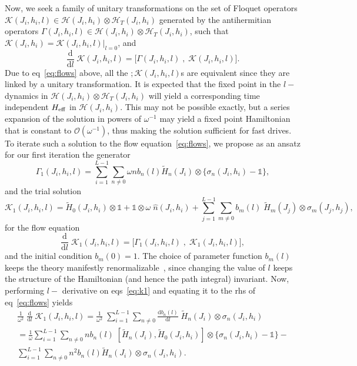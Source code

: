 \documentclass[a4paper,10pt]{article}
\begin{document}
Now, we seek a family of unitary transformations on the set of Floquet operators $\mathcal{K}(J_i,h_i,l)\in\mathcal{H}(J_i,h_i)\otimes\mathcal{H}_T(J_i,h_i) $ generated by the antihermitian operators $\Gamma(J_i,h_i,l)\in\mathcal{H}(J_i,h_i)\otimes\mathcal{H}_T(J_i,h_i)$, such that $\mathcal{K}(J_i,h_i) = \mathcal{K}(J_i,h_i,l)|_{l=0}$, and 
\begin{equation}
\label{eq:flows}
\frac{\mathrm{d}}{\mathrm{d}l}\;\mathcal{K}(J_i,h_i,l) = \bigg[\Gamma(J_i,h_i,l)\;,\;\mathcal{K}(J_i,h_i,l)\bigg].
\end{equation}
Due to eq~\ref{eq:flows} above, all the $;\mathcal{K}(J_i,h_i,l)$s are equivalent since they are linked by a unitary transformation. It is expected that the fixed point in the $l-$dynamics in $\mathcal{H}(J_i,h_i)\otimes\mathcal{H}_T(J_i,h_i)$ will yield a corresponding time independent $H_{\rm eff}$ in $\mathcal{H}(J_i,h_i)$. This may not be possible exactly, but a series expansion of the solution in powers of $\omega^{-1}$ may yield a fixed point Hamiltonian that is constant to $\mathcal{O}(\omega^{-1})$, thus making the solution sufficient for fast drives. To iterate such a solution to the flow equation~\ref{eq:flows}, we propose as an ansatz for our first iteration the generator
\begin{equation}
\label{eq:g1}
\Gamma_1(J_i,h_i,l) = \sum_{i=1}^{L-1}\sum_{n\neq0} \omega n b_n(l)\tilde{H}_n(J_i) \otimes \bigg\{\sigma_n(J_i,h_i)-\mathds{1}\bigg\},
\end{equation}
and the trial solution
\begin{equation}
\label{eq:k1}
\mathcal{K}_1(J_i,h_i,l) = \tilde{H}_0(J_i,h_i) \otimes \mathds{1} + \mathds{1}\otimes \omega \; \hat{n}(J_i,h_i)  + \sum_{j=1}^{L-1} \sum_{m\neq 0} b_m(l)\;\tilde{H}_m(J_j)  \otimes \sigma_m(J_j,h_j),
\end{equation}
for the flow equation
\begin{equation}
\label{eq:firstflow}
\frac{\mathrm{d}}{\mathrm{d}l}\;\mathcal{K}_1(J_i,h_i,l) = \bigg[\Gamma_1(J_i,h_i,l)\;,\;\mathcal{K}_1(J_i,h_i,l)\bigg],
\end{equation}
and the initial condition $b_m(0)=1$. The choice of parameter function $b_m(l)$ keeps the theory manifestly renormalizable~\cite{unitaryflow}, since changing the value of $l$ keeps the structure of the Hamiltonian (and hence the path integral) invariant.
Now, performing $l-$ derivative on eqs~\ref{eq:k1} and equating it to the rhs of eq~\ref{eq:flows} yields
\begin{multline}
 \frac{1}{\omega^2}\; \frac{\mathrm{d}}{\mathrm{d}l}\; \mathcal{K}_1(J_i,h_i,l) = \frac{1}{\omega^2}\;\sum_{i=1}^{L-1} \sum_{n\neq 0} \frac{\mathrm{d}b_n(l)}{\mathrm{d}l}\;\tilde{H}_n(J_i)  \otimes \sigma_n(J_i,h_i) \\
=\frac{1}{\omega}\sum_{i=1}^{L-1}\sum_{n\neq0} n b_n(l)\; \left[\tilde{H}_n(J_i),\tilde{H}_0(J_i,h_i)\right]\otimes \bigg\{\sigma_n(J_i,h_i)-\mathds{1}\bigg\}-  \\
\sum_{i=1}^{L-1}\sum_{n\neq0} n^2 b_n(l) \tilde{H}_n (J_i)\otimes  \sigma_n(J_i,h_i).
\end{multline}
\end{document}
